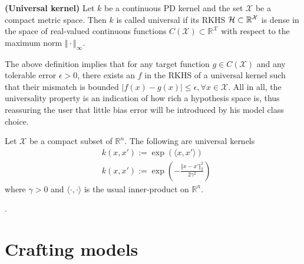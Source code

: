 \begin{definition}
	\textbf{(Universal kernel)}
	Let $k$ be a continuous PD kernel and the set $\mathcal{X}$ be a compact metric space. Then $k$ is called universal if its RKHS $\mathcal{H} \subset \mathbb{R}^\mathcal{X}$ is dense in the space of real-valued continuous functions $C(\mathcal{X}) \subset \mathbb{R}^\mathcal{X}$ with respect to the maximum norm $\Vert \cdot \Vert_\infty$.
\end{definition}

The above definition implies that for any target function $g \in C(\mathcal{X})$ and any tolerable error $\epsilon > 0$, there exists an $f$ in the RKHS of a universal kernel such that their mismatch is bounded $| f(x) - g(x) | \leq \epsilon, \forall x \in \mathcal{X}$.
All in all, the universality property is an indication of how rich a hypothesis space is, thus reassuring the user that little bias error will be introduced by his model class choice.

\begin{proposition}
	Let $\mathcal{X}$ be a compact subset of $\mathbb{R}^n$. The following are universal kernels
	\begin{align}
		&k(x,x') := \exp( \langle x, x' \rangle) \\
		&k(x,x') := \exp\left( - \frac{\Vert x - x' \Vert^2_2}{2 \gamma^2} \right)
	\end{align}
	where $\gamma >0$ and $\langle \cdot, \cdot \rangle$ is the usual inner-product on $\mathbb{R}^n$. 
\end{proposition}

\begin{my_proof}
	\cite[Corollary~4.58]{steinwart2008svm_book}.
\end{my_proof}




\section{Crafting models}
\label{sec.crafting_models}

